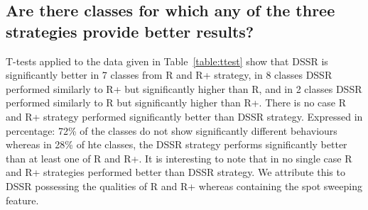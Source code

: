 \documentclass{acm_proc_article-sp}
\begin{document}
\subsection{Are there classes for which any of the three strategies provide better results?}


T-tests applied to the data given in Table~\ref{table:ttest} show that DSSR is significantly better in 7 classes from R and R+ strategy, in 8 classes DSSR performed similarly to R+  but significantly higher than R, and in 2 classes DSSR performed similarly to R but significantly higher than R+. There is no case R and R+ strategy performed significantly better than DSSR strategy. Expressed in percentage: 72\%  of the classes do not show significantly different behaviours whereas in 28\% of hte classes, the DSSR strategy performs significantly better than at least one of R and R+. It is interesting to note that in no single case R and R+ strategies performed better than DSSR strategy. We attribute this to DSSR possessing the qualities of R and R+ whereas containing the spot sweeping feature.
\end{document}
